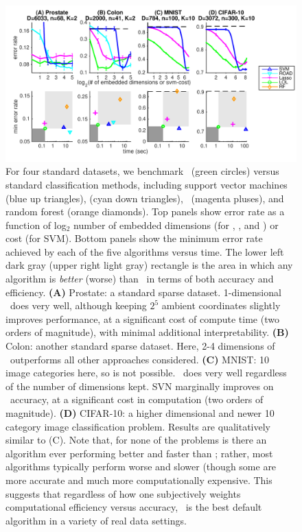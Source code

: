 \documentclass[10pt]{article}
\begin{document}
\begin{figure}
\centering
\includegraphics[width=1\linewidth]{../Figs/realdata.pdf}
\caption{
For four standard datasets, we benchmark \Lol~(green circles) versus standard classification methods, including support vector machines (blue up triangles),  (cyan down triangles), ~(magenta pluses), and random forest (orange diamonds). 
Top panels show error rate as a function of log$_2$ number of embedded dimensions (for \Lol, , and ) or cost (for SVM).
Bottom panels show the minimum error rate achieved by each of the five algorithms versus time.
The lower left dark gray (upper right light gray) rectangle is the area in which any algorithm is \emph{better}  (worse) than \Lol~in terms of both accuracy and efficiency.
\textbf{(A)} Prostate: a standard sparse dataset.  1-dimensional \Lol~does very well, although keeping $2^5$ ambient coordinates slightly improves performance, at a significant cost of compute time (two orders of magnitude), with minimal additional interpretability.
\textbf{(B)} Colon: another standard sparse dataset.  Here, 2-4 dimensions of \Lol~outperforms all other approaches considered.
\textbf{(C)} MNIST: 10 image categories here, so  is not possible.  \Lol~does very well regardless of the number of dimensions kept.  SVN marginally improves on \Lol~accuracy, at a significant cost in computation (two orders of magnitude).
\textbf{(D)} CIFAR-10: a higher dimensional and newer 10 category image classification problem.  Results are qualitatively similar to (C).
% 
Note that, for none of the problems is there an algorithm ever performing better and faster than \Lol; rather, most algorithms typically perform worse and slower (though some are more accurate and much more computationally expensive. 
This suggests that regardless of how one subjectively weights computational efficiency versus accuracy, \Lol~is the best default algorithm in a variety of real data settings.
}
\label{fig:realdata}
\end{figure}
\end{document}

